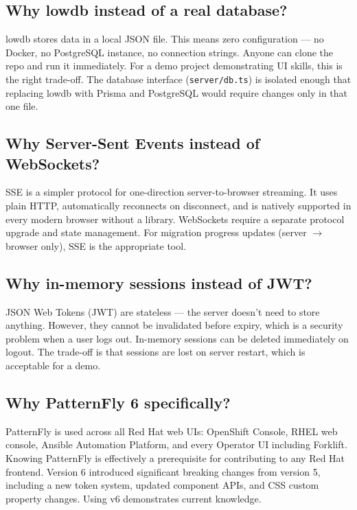 \documentclass[12pt,a4paper]{article}
\begin{document}
\subsection{Why lowdb instead of a real database?}

lowdb stores data in a local JSON file. This means zero configuration — no Docker, no PostgreSQL instance, no connection strings. Anyone can clone the repo and run it immediately. For a demo project demonstrating UI skills, this is the right trade-off. The database interface (\texttt{server/db.ts}) is isolated enough that replacing lowdb with Prisma and PostgreSQL would require changes only in that one file.

\subsection{Why Server-Sent Events instead of WebSockets?}

SSE is a simpler protocol for one-direction server-to-browser streaming. It uses plain HTTP, automatically reconnects on disconnect, and is natively supported in every modern browser without a library. WebSockets require a separate protocol upgrade and state management. For migration progress updates (server $\to$ browser only), SSE is the appropriate tool.

\subsection{Why in-memory sessions instead of JWT?}

JSON Web Tokens (JWT) are stateless — the server doesn't need to store anything. However, they cannot be invalidated before expiry, which is a security problem when a user logs out. In-memory sessions can be deleted immediately on logout. The trade-off is that sessions are lost on server restart, which is acceptable for a demo.

\subsection{Why PatternFly 6 specifically?}

PatternFly is used across all Red Hat web UIs: OpenShift Console, RHEL web console, Ansible Automation Platform, and every Operator UI including Forklift. Knowing PatternFly is effectively a prerequisite for contributing to any Red Hat frontend. Version 6 introduced significant breaking changes from version 5, including a new token system, updated component APIs, and CSS custom property changes. Using v6 demonstrates current knowledge.
\end{document}
